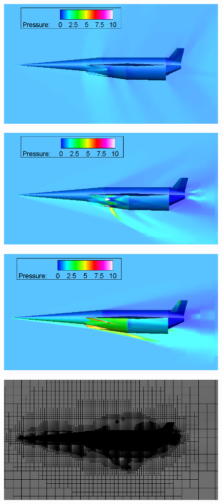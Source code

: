 \begin{figure}
	\centering
	\includegraphics[width=0.7\linewidth]{figures/3_vehicle_design/M1p1AoA6}
	\caption{}
	\label{fig:M1}
\end{figure}
\begin{figure}
	\centering
	\includegraphics[width=0.7\linewidth]{figures/3_vehicle_design/M3AoA6}
	\caption{}
	\label{fig:M3AoA6}
\end{figure}
\begin{figure}
	\centering
	\includegraphics[width=0.7\linewidth]{figures/3_vehicle_design/M7AoA6}
	\caption{}
	\label{fig:M7AoA6}
\end{figure}

\begin{figure}
\centering
\includegraphics[width=0.7\linewidth]{figures/3_vehicle_design/M3AoA6GRID}
\caption{}
\label{fig:M3AoA6GRID}
\end{figure}



